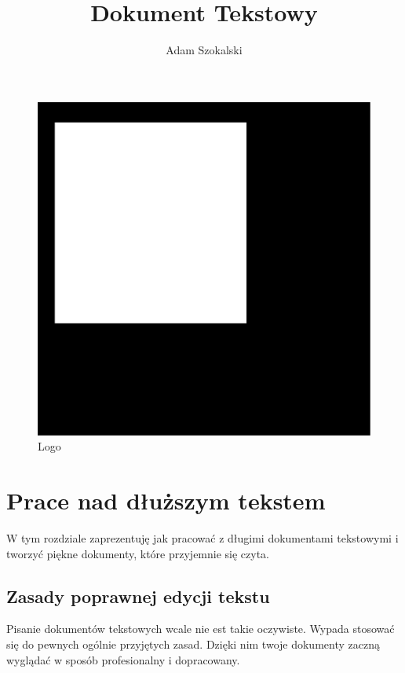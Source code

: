 \documentclass[11pt,polish]{article}
\author{
  Adam Szokalski
}
\title{Dokument Tekstowy}
\begin{document}
\maketitle


\begin{center}
    \begin{figure}[h]
        \includegraphics[scale=0.2]{logo}
        \centering
        \caption{Logo}
    \end{figure}
\end{center}

\newpage

\tableofcontents

\listoffigures 

\newpage


\section{Prace nad dłuższym tekstem}
W tym rozdziale zaprezentuję jak pracować z długimi dokumentami tekstowymi i tworzyć piękne dokumenty, które przyjemnie się czyta.

\subsection{Zasady poprawnej edycji tekstu}
Pisanie dokumentów tekstowych wcale nie est takie oczywiste. Wypada stosować się do pewnych ogólnie przyjętych zasad. Dzięki nim twoje dokumenty zaczną wyglądać w sposób profesionalny i dopracowany.
\end{document}
